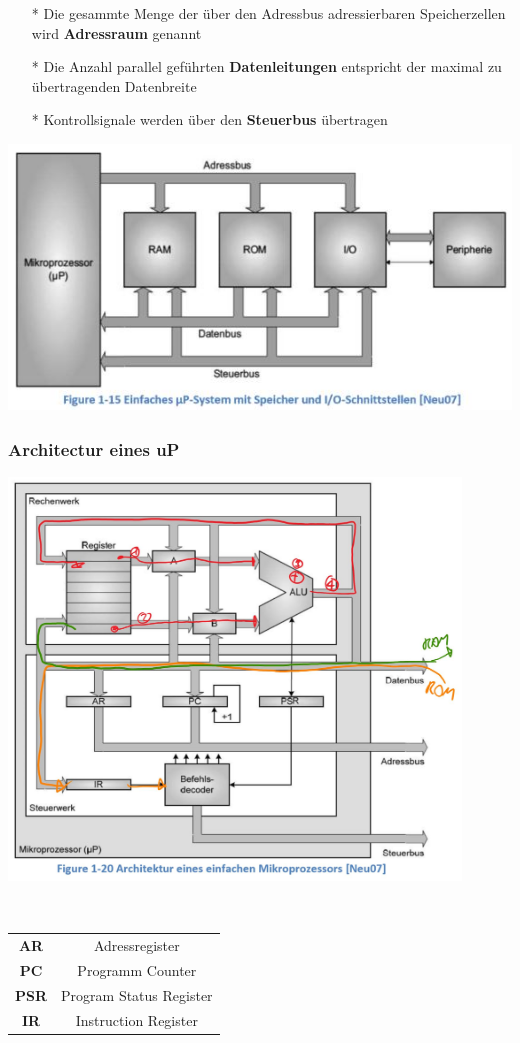 \begin{itemize}
    \item[*] Die gesammte Menge der über den Adressbus adressierbaren Speicherzellen wird \textbf{Adressraum} genannt
    \item[*] Die Anzahl parallel geführten \textbf{Datenleitungen} entspricht der maximal zu übertragenden Datenbreite
    \item[*] Kontrollsignale werden über den \textbf{Steuerbus} übertragen
\end{itemize}
    \includegraphics[width=0.5\linewidth]{images/SimpleuPSystem}
    
\subsubsection{Architectur eines uP}
    \begin{minipage}{12cm}
        \includegraphics[width= 12cm]{images/ArchitectuP}
    \end{minipage}
	\begin{minipage}{0.5cm}
		\ \
	\end{minipage}
    \begin{minipage}[r]{4cm} 
        \begin{tabular}[r]{c|c}
            \textbf{AR} & Adressregister  \\ 
            \textbf{PC} & Programm Counter  \\ 
            \textbf{PSR}& Program Status Register \\ 
            \textbf{IR} & Instruction Register  \\ 
        \end{tabular} 
	\end{minipage}
    
